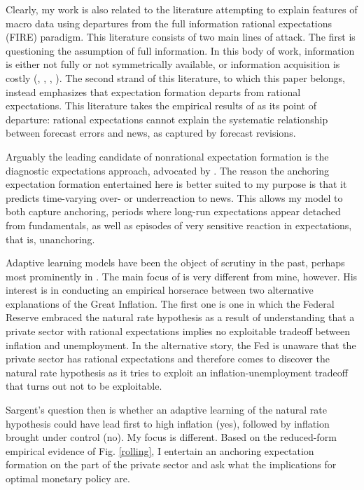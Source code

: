 \documentclass[11pt]{article}
\renewcommand{\[}{\begin{equation}}
\renewcommand{\]}{\end{equation}}
\begin{document}
Clearly, my work is also related to the literature attempting to explain features of macro data using departures from the full information rational expectations (FIRE) paradigm. This literature consists of two main lines of attack. The first is questioning the assumption of full information. In this body of work, information is either not fully or not symmetrically available, or information acquisition is costly (\cite{mankiw2002sticky}, \cite{sims2003}, \cite{mackowiak2009optimal}, \cite{angeletos2009policy}). The second strand of this literature, to which this paper belongs, instead emphasizes that expectation formation departs from rational expectations. This literature takes the empirical results of \cite{coibion2015information} as its point of departure: rational expectations cannot explain the systematic relationship between forecast errors and news, as captured by forecast revisions. 

Arguably the leading candidate of nonrational expectation formation is the diagnostic expectations approach, advocated by \cite{bordalo2018diagnostic}. The reason the anchoring expectation formation entertained here is better suited to my purpose is that it predicts time-varying over- or underreaction to news. This allows my model to both capture anchoring, periods where long-run expectations appear detached from fundamentals, as well as episodes of very sensitive reaction in expectations, that is, unanchoring.

Adaptive learning models have been the object of scrutiny in the past, perhaps most prominently in \cite{sargent1999}. The main focus of \cite{sargent1999} is very different from mine, however. His interest is in conducting an empirical horserace between two alternative explanations of the Great Inflation. The first one is one in which the Federal Reserve embraced the natural rate hypothesis as a result of understanding that a private sector with rational expectations implies no exploitable tradeoff between inflation and unemployment. In the alternative story, the Fed is unaware that the private sector has rational expectations and therefore comes to discover the natural rate hypothesis as it tries to exploit an inflation-unemployment tradeoff that turns out not to be exploitable. 

Sargent's question then is whether an adaptive learning of the natural rate hypothesis could have lead first to high inflation (yes), followed by inflation brought under control (no). My focus is different. Based on the reduced-form empirical evidence of Fig. \ref{rolling}, I entertain an anchoring expectation formation on the part of the private sector and ask what the implications for optimal monetary policy are.
\end{document}
